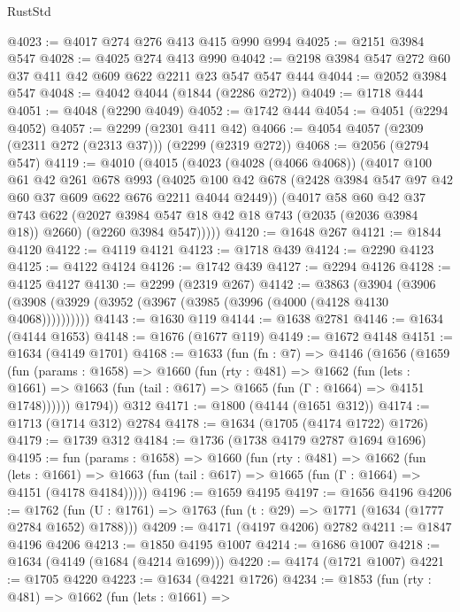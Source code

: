 \begin{lexlean}{RustStd}
\begin{coremodule}
@4023 := @4017 @274 @276 @413 @415 @990 @994
@4025 := @2151 @3984 @547
@4028 := @4025 @274 @413 @990
@4042 := @2198 @3984 @547 @272 @60 @37 @411 @42 @609 @622 @2211 @23 @547 @547 @444
@4044 := @2052 @3984 @547
@4048 := @4042 @4044 (@1844 (@2286 @272))
@4049 := @1718 @444
@4051 := @4048 (@2290 @4049)
@4052 := @1742 @444
@4054 := @4051 (@2294 @4052)
@4057 := @2299 (@2301 @411 @42)
@4066 := @4054 @4057 (@2309 (@2311 @272 (@2313 @37))) (@2299 (@2319 @272))
@4068 := @2056 (@2794 @547)
@4119 := @4010
    (@4015
      (@4023
        (@4028 (@4066 @4068))
        (@4017
          @100
          @61
          @42
          @261
          @678
          @993
          (@4025 @100 @42 @678 (@2428 @3984 @547 @97 @42 @60 @37 @609 @622 @676 @2211 @4044 @2449))
          (@4017
            @58
            @60
            @42
            @37
            @743
            @622
            (@2027 @3984 @547 @18 @42 @18 @743 (@2035 (@2036 @3984 @18)) @2660)
            (@2260 @3984 @547)))))
@4120 := @1648 @267
@4121 := @1844 @4120
@4122 := @4119 @4121
@4123 := @1718 @439
@4124 := @2290 @4123
@4125 := @4122 @4124
@4126 := @1742 @439
@4127 := @2294 @4126
@4128 := @4125 @4127
@4130 := @2299 (@2319 @267)
@4142 := @3863
    (@3904 (@3906 (@3908 (@3929 (@3952 (@3967 (@3985 (@3996 (@4000 (@4128 @4130 @4068))))))))))
@4143 := @1630 @119
@4144 := @1638 @2781
@4146 := @1634 (@4144 @1653)
@4148 := @1676 (@1677 @119)
@4149 := @1672 @4148
@4151 := @1634 (@4149 @1701)
@4168 := @1633
    (fun (fn : @7) =>
    @4146
      (@1656
        (@1659
          (fun (params : @1658) =>
          @1660
            (fun (rty : @481) =>
            @1662
              (fun (lets : @1661) =>
              @1663 (fun (tail : @617) => @1665 (fun (Γ : @1664) => @4151 @1748))))))
        @1794))
    @312
@4171 := @1800 (@4144 (@1651 @312))
@4174 := @1713 (@1714 @312) @2784
@4178 := @1634 (@1705 (@4174 @1722) @1726)
@4179 := @1739 @312
@4184 := @1736 (@1738 @4179 @2787 @1694 @1696)
@4195 := fun (params : @1658) =>
  @1660
    (fun (rty : @481) =>
    @1662
      (fun (lets : @1661) =>
      @1663 (fun (tail : @617) => @1665 (fun (Γ : @1664) => @4151 (@4178 @4184)))))
@4196 := @1659 @4195
@4197 := @1656 @4196
@4206 := @1762 (fun (U : @1761) => @1763 (fun (t : @29) => @1771 (@1634 (@1777 @2784 @1652) @1788)))
@4209 := @4171 (@4197 @4206) @2782
@4211 := @1847 @4196 @4206
@4213 := @1850 @4195 @1007
@4214 := @1686 @1007
@4218 := @1634 (@4149 (@1684 (@4214 @1699)))
@4220 := @4174 (@1721 @1007)
@4221 := @1705 @4220
@4223 := @1634 (@4221 @1726)
@4234 := @1853
    (fun (rty : @481) =>
    @1662
      (fun (lets : @1661) =>

\end{coremodule}
\end{lexlean}
